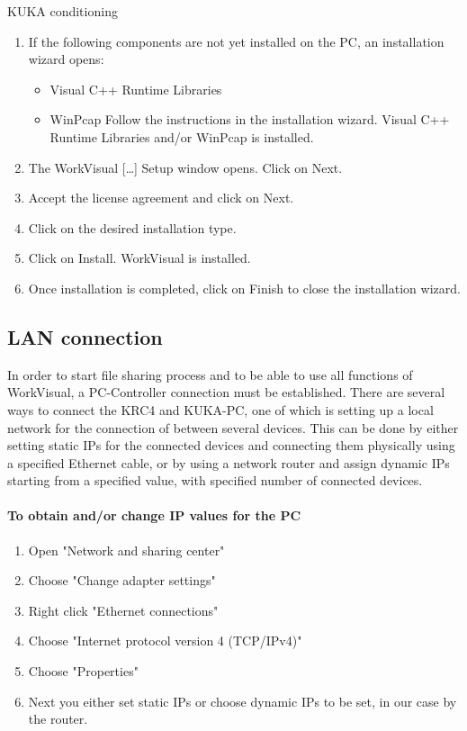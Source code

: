 \documentclass{book}
\begin{document}
\begin{chapter}{KUKA conditioning}
\begin{enumerate}
					\item If the following components are not yet installed on the PC, an installation wizard opens:
						\begin{itemize}
							\item Visual C++ Runtime Libraries
							\item WinPcap
							Follow the instructions in the installation wizard. Visual C++ Runtime Libraries	and/or WinPcap is installed.
						\end{itemize}
					\item The WorkVisual […] Setup window opens. Click on Next.
					\item Accept the license agreement and click on Next.
					\item Click on the desired installation type.
					\item Click on Install. WorkVisual is installed.	
					\item Once installation is completed, click on Finish to close the installation wizard.
				\end{enumerate}
			\subsection{LAN connection}
			In order to start file sharing process and to be able to use all functions of WorkVisual, a PC-Controller connection must be established. There are several ways to connect the KRC4 and KUKA-PC, one of which is setting up a local network for the connection of between several devices. This can be done by either setting static IPs for the connected devices and connecting them physically using a specified Ethernet cable, or by using a network router and assign dynamic IPs starting from a specified value, with specified number of connected devices. 
			\newline	
			\paragraph{To obtain and/or change IP values for the PC}
			\begin{enumerate}
				\item Open "Network and sharing center" 
				\item Choose "Change adapter settings"
				\item Right click "Ethernet connections"
				\item  Choose "Internet protocol version 4 (TCP/IPv4)"
				\item  Choose "Properties"
				\item Next you either set static IPs or choose dynamic IPs to be set, in our case by the router.
			\end{enumerate}
			

\end{chapter}
\end{document}

